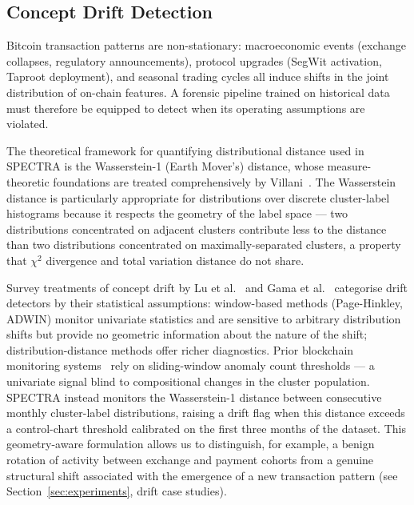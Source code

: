 \documentclass[journal]{IEEEtran}
\begin{document}
\subsection{Concept Drift Detection}
\label{subsec:drift}

Bitcoin transaction patterns are non-stationary: macroeconomic events
(exchange collapses, regulatory announcements), protocol upgrades (SegWit
activation, Taproot deployment), and seasonal trading cycles all induce shifts
in the joint distribution of on-chain features.  A forensic pipeline trained on
historical data must therefore be equipped to detect when its operating
assumptions are violated.

The theoretical framework for quantifying distributional distance used in
SPECTRA is the Wasserstein-1 (Earth Mover's) distance, whose measure-theoretic
foundations are treated comprehensively by Villani~\cite{Villani2009}.  The
Wasserstein distance is particularly appropriate for distributions over discrete
cluster-label histograms because it respects the geometry of the label space
--- two distributions concentrated on adjacent clusters contribute less to the
distance than two distributions concentrated on maximally-separated clusters,
a property that $\chi^2$ divergence and total variation distance do not share.

Survey treatments of concept drift by Lu et al.~\cite{Lu2018} and Gama et
al.~\cite{Gama2014} categorise drift detectors by their statistical assumptions:
window-based methods (Page-Hinkley, ADWIN) monitor univariate statistics and
are sensitive to arbitrary distribution shifts but provide no geometric
information about the nature of the shift; distribution-distance methods
offer richer diagnostics.  Prior blockchain monitoring
systems~\cite{Chainalysis2023} rely on sliding-window anomaly count thresholds
--- a univariate signal blind to compositional changes in the cluster
population.  SPECTRA instead monitors the Wasserstein-1 distance between
consecutive monthly cluster-label distributions, raising a drift flag when this
distance exceeds a control-chart threshold calibrated on the first three months
of the dataset.  This geometry-aware formulation allows us to distinguish, for
example, a benign rotation of activity between exchange and payment cohorts from
a genuine structural shift associated with the emergence of a new transaction
pattern (see Section~\ref{sec:experiments}, drift case studies).
\end{document}
